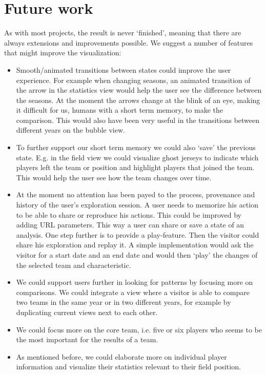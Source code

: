 \documentclass[]{sigchi}
\begin{document}
\section{Future work}\label{sec:futurework}
As with most projects, the result is never `finished', meaning that there are
always extensions and improvements possible. We suggest a number of features that might improve the visualization:
\begin{itemize}
    \item Smooth/animated transitions between states could improve the user experience.
        For example when changing seasons, an animated transition of the arrow in 
        the statistics view would help the user see the difference between the 
        seasons. At the moment the arrows change at the blink of an eye, making it  
        difficult for us, humans with a short term memory, to make the comparison. 
        This would also have been very useful in the transitions between different 
        years on the bubble view.
    \item To further support our short term memory we could also `save' the
        previous state. E.g. in the field view we could visualize ghost jerseys
        to indicate which players left the team or position and highlight
        players that joined the team.  This would help the user see how the team
        changes over time.
    \item At the moment no attention has been payed to the process, provenance
        and history of the user's exploration session. A user needs to
        memorize his action to be able to share or reproduce his actions. This
        could be improved by adding URL parameters. This way a user can
        share or save a state of an analysis. One step further is to provide a
        play-feature. Then the visitor could share his exploration and replay
        it. A simple implementation would ask the visitor for a start date and an
        end date and would then `play' the changes of the selected team and 
        characteristic.
    \item We could support users further in looking for patterns by focusing
        more on comparisons. We could integrate a view where a visitor is able
        to compare two teams in the same year or in two different years, for example   
        by duplicating current views next to each other.
    \item We could focus more on the core team, i.e. five or six players who seems 
        to be the most important for the results of a team.
    \item As mentioned before, we could elaborate more on individual player 
        information and visualize their statistics relevant to their field position.

\end{itemize}
\end{document}
